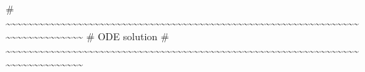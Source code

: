 \documentclass[
  11pt,
  letterpaper,
  DIV=11,
  numbers=noendperiod]{scrartcl}
\newenvironment{Shaded}{\begin{snugshade}}{\end{snugshade}}
\newcommand{\CommentTok}[1]{\textcolor[rgb]{0.37,0.37,0.37}{#1}}
\begin{document}
\begin{Shaded}
\begin{Highlighting}[]
\CommentTok{\# \textasciitilde{}\textasciitilde{}\textasciitilde{}\textasciitilde{}\textasciitilde{}\textasciitilde{}\textasciitilde{}\textasciitilde{}\textasciitilde{}\textasciitilde{}\textasciitilde{}\textasciitilde{}\textasciitilde{}\textasciitilde{}\textasciitilde{}\textasciitilde{}\textasciitilde{}\textasciitilde{}\textasciitilde{}\textasciitilde{}\textasciitilde{}\textasciitilde{}\textasciitilde{}\textasciitilde{}\textasciitilde{}\textasciitilde{}\textasciitilde{}\textasciitilde{}\textasciitilde{}\textasciitilde{}\textasciitilde{}\textasciitilde{}\textasciitilde{}\textasciitilde{}\textasciitilde{}\textasciitilde{}\textasciitilde{}\textasciitilde{}\textasciitilde{}\textasciitilde{}\textasciitilde{}\textasciitilde{}\textasciitilde{}\textasciitilde{}\textasciitilde{}\textasciitilde{}\textasciitilde{}\textasciitilde{}\textasciitilde{}\textasciitilde{}\textasciitilde{}\textasciitilde{}\textasciitilde{}\textasciitilde{}\textasciitilde{}\textasciitilde{}\textasciitilde{}\textasciitilde{}\textasciitilde{}\textasciitilde{}\textasciitilde{}\textasciitilde{}\textasciitilde{}\textasciitilde{}\textasciitilde{}\textasciitilde{}\textasciitilde{}\textasciitilde{}\textasciitilde{}\textasciitilde{}\textasciitilde{}\textasciitilde{}\textasciitilde{}\textasciitilde{}\textasciitilde{}\textasciitilde{}\textasciitilde{}\textasciitilde{}}
\CommentTok{\# ODE solution}
\CommentTok{\# \textasciitilde{}\textasciitilde{}\textasciitilde{}\textasciitilde{}\textasciitilde{}\textasciitilde{}\textasciitilde{}\textasciitilde{}\textasciitilde{}\textasciitilde{}\textasciitilde{}\textasciitilde{}\textasciitilde{}\textasciitilde{}\textasciitilde{}\textasciitilde{}\textasciitilde{}\textasciitilde{}\textasciitilde{}\textasciitilde{}\textasciitilde{}\textasciitilde{}\textasciitilde{}\textasciitilde{}\textasciitilde{}\textasciitilde{}\textasciitilde{}\textasciitilde{}\textasciitilde{}\textasciitilde{}\textasciitilde{}\textasciitilde{}\textasciitilde{}\textasciitilde{}\textasciitilde{}\textasciitilde{}\textasciitilde{}\textasciitilde{}\textasciitilde{}\textasciitilde{}\textasciitilde{}\textasciitilde{}\textasciitilde{}\textasciitilde{}\textasciitilde{}\textasciitilde{}\textasciitilde{}\textasciitilde{}\textasciitilde{}\textasciitilde{}\textasciitilde{}\textasciitilde{}\textasciitilde{}\textasciitilde{}\textasciitilde{}\textasciitilde{}\textasciitilde{}\textasciitilde{}\textasciitilde{}\textasciitilde{}\textasciitilde{}\textasciitilde{}\textasciitilde{}\textasciitilde{}\textasciitilde{}\textasciitilde{}\textasciitilde{}\textasciitilde{}\textasciitilde{}\textasciitilde{}\textasciitilde{}\textasciitilde{}\textasciitilde{}\textasciitilde{}\textasciitilde{}\textasciitilde{}\textasciitilde{}\textasciitilde{}}

\end{Highlighting}
\end{Shaded}
\end{document}
